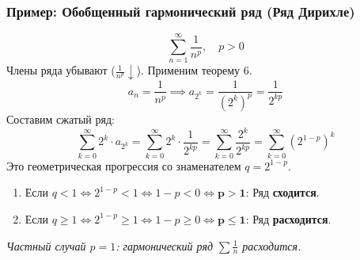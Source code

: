 \subsubsection*{Пример: Обобщенный гармонический ряд (Ряд Дирихле)}
\[ \sum_{n=1}^{\infty} \frac{1}{n^p}, \quad p > 0 \]
Члены ряда убывают ($ \frac{1}{n^p} \downarrow $). Применим теорему 6.
\[ a_n = \frac{1}{n^p} \implies a_{2^k} = \frac{1}{(2^k)^p} = \frac{1}{2^{kp}} \]
Составим сжатый ряд:
\[ \sum_{k=0}^{\infty} 2^k \cdot a_{2^k} = \sum_{k=0}^{\infty} 2^k \cdot \frac{1}{2^{kp}} = \sum_{k=0}^{\infty} \frac{2^k}{2^{kp}} = \sum_{k=0}^{\infty} \left( 2^{1-p} \right)^k \]
Это геометрическая прогрессия со знаменателем $q = 2^{1-p}$.

\begin{tcolorbox}[title=Вывод по p-ряду]
    \begin{enumerate}
        \item Если $q < 1 \Leftrightarrow 2^{1-p} < 1 \Leftrightarrow 1-p < 0 \Leftrightarrow \mathbf{p > 1}$:
        Ряд \textbf{сходится}.
        
        \item Если $q \geq 1 \Leftrightarrow 2^{1-p} \geq 1 \Leftrightarrow 1-p \geq 0 \Leftrightarrow \mathbf{p \leq 1}$:
        Ряд \textbf{расходится}.
    \end{enumerate}
    \textit{Частный случай $p=1$: гармонический ряд $\sum \frac{1}{n}$ расходится.}
\end{tcolorbox}

